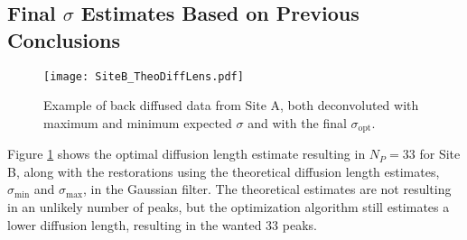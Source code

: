 \documentclass[../../CompleteThesis2/Complete_2ndDraft]{subfiles}
\begin{document}
\subsection[Final $\sigma$ Estimates]{Final $\sigma$ Estimates Based on Previous Conclusions}
\label{Subsec:Results_DiffLenEst_AlphabetCores_FinalEstimates}
\begin{figure}[!htb]
	\centering
	\texttt{[image: SiteB\_TheoDiffLens.pdf]}
	\caption[$\sigma$, theoretical and optimal]{\small Example of back diffused data from Site A, both deconvoluted with maximum and minimum expected $\sigma$ and with the final $\sigma_{\text{opt}}$.}
	\label{Fig:SiteA_TheoDiffLens}
\end{figure}
Figure \ref{Fig:SiteA_TheoDiffLens} shows the optimal diffusion length estimate resulting in $N_P = 33$ for Site B, along with the restorations using the theoretical diffusion length estimates, $\sigma_{\text{min}}$ and $\sigma_{\text{max}}$, in the Gaussian filter. The theoretical estimates are not resulting in an unlikely number of peaks, but the optimization algorithm still estimates a lower diffusion length, resulting in the wanted 33 peaks.
\end{document}

